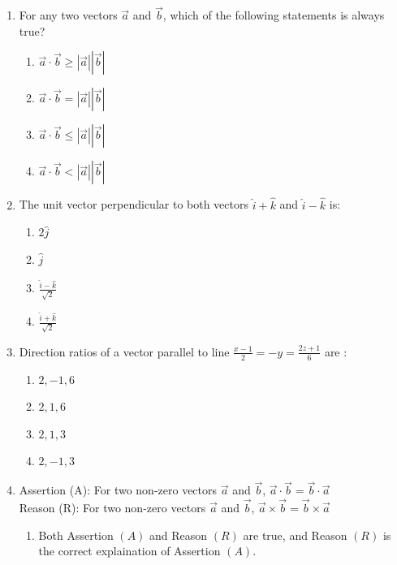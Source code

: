 \begin{enumerate}
	\item For any two vectors $\overrightarrow{a}$ and $\overrightarrow{b}$, which of the following statements is always true?
		\begin{enumerate}
			\item $\overrightarrow{a} \cdot \overrightarrow{b} \geq |\overrightarrow{a}||\overrightarrow{b}|$
			\item $\overrightarrow{a} \cdot \overrightarrow{b} = |\overrightarrow{a}||\overrightarrow{b}|$
			\item $\overrightarrow{a} \cdot \overrightarrow{b} \leq |\overrightarrow{a}||\overrightarrow{b}|$
			\item $\overrightarrow{a} \cdot \overrightarrow{b} < |\overrightarrow{a}||\overrightarrow{b}|$
		\end{enumerate}
	\item The unit vector perpendicular to both vectors $\hat{i} + \hat{k}$ and $\hat{i} - \hat{k}$ is:
		\begin{enumerate}
			\item $2\hat{j}$
			\item $\hat{j}$
			\item $\frac{\hat{i} - \hat{k}}{\sqrt{2}}$
			\item $\frac{\hat{i} + \hat{k}}{\sqrt{2}}$
		\end{enumerate}
	\item Direction ratios of a vector parallel to line $\frac{x - 1}{2}= -y = \frac{2z + 1}{6}$ are :
		\begin{enumerate}
			\item $2, -1, 6$
			\item $2, 1, 6$
			\item $2, 1, 3$
			\item $2, -1, 3$
		\end{enumerate}
	\item Assertion (A): For two non-zero vectors $\overrightarrow{a}$ and $\overrightarrow{b}$, $\overrightarrow{a} \cdot \overrightarrow{b} = \overrightarrow{b} \cdot \overrightarrow{a}$\\
		Reason (R): For two non-zero vectors $\overrightarrow{a}$ and $\overrightarrow{b}$, $\overrightarrow{a} \times \overrightarrow{b} = \overrightarrow{b} \times \overrightarrow{a}$
		\begin{enumerate}
			\item Both Assertion $(A)$ and Reason $(R)$ are true, and Reason $(R)$ is the correct explaination of Assertion $(A)$.

\end{enumerate}
\end{enumerate}
